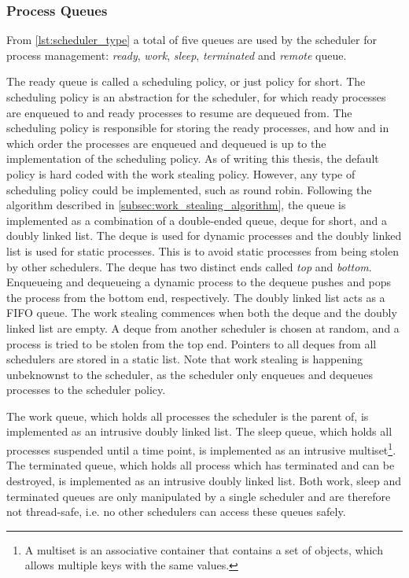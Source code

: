 \subsubsection{Process Queues}


From \cref{lst:scheduler_type} a total of five queues are used by the scheduler for process management: \textit{ready}, \textit{work}, \textit{sleep}, \textit{terminated} and \textit{remote} queue. 

The ready queue is called a scheduling policy, or just policy for short. The scheduling policy is an abstraction for the scheduler, for which ready processes are enqueued to and ready processes to resume are dequeued from. The scheduling policy is responsible for storing the ready processes, and how and in which order the processes are enqueued and dequeued is up to the implementation of the scheduling policy. As of writing this thesis, the default policy is hard coded with the work stealing policy. However, any type of scheduling policy could be implemented, such as round robin. Following the algorithm described in \cref{subsec:work_stealing_algorithm}, the queue is implemented as a combination of a double\hyp{}ended queue, deque for short, and a doubly linked list. The deque is used for dynamic processes and the doubly linked list is used for static processes. This is to avoid static processes from being stolen by other schedulers. The deque has two distinct ends called \textit{top} and \textit{bottom}. Enqueueing and dequeueing a dynamic process to the dequeue pushes and pops the process from the bottom end, respectively. The doubly linked list acts as a FIFO queue. The work stealing commences when both the deque and the doubly linked list are empty. A deque from another scheduler is chosen at random, and a process is tried to be stolen from the top end. Pointers to all deques from all schedulers are stored in a static list. Note that work stealing is happening unbeknownst to the scheduler, as the scheduler only enqueues and dequeues processes to the scheduler policy. 

The work queue, which holds all processes the scheduler is the parent of, is implemented as an intrusive doubly linked list. The sleep queue, which holds all processes suspended until a time point, is implemented as an intrusive multiset\footnote{A multiset is an associative container that contains a set of objects, which allows multiple keys with the same values.}. The terminated queue, which holds all process which has terminated and can be destroyed, is implemented as an intrusive doubly linked list. Both work, sleep and terminated queues are only manipulated by a single scheduler and are therefore not thread\hyp{}safe, i.e. no other schedulers can access these queues safely.


